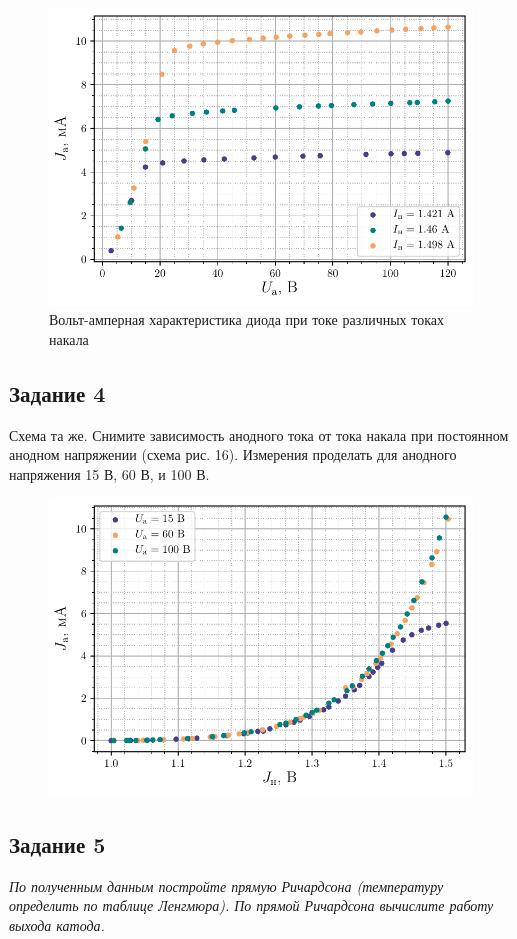 \begin{figure}[H]
	\centering
    \includegraphics[scale=1]{scripts/fig3}
	\caption{Вольт-амперная характеристика диода при токе различных токах
    накала}
	\label{fig:17}
\end{figure}

\subsection{Задание 4}
Схема та же. Снимите зависимость анодного тока от тока накала при постоянном анодном напряжении (схема рис. 16). Измерения проделать для анодного напряжения 15 В, 60 В, и 100 В.

\begin{figure}[H]
	\centering
    \includegraphics[width=0.85\linewidth]{scripts/fig4}
	\caption{}
	\label{fig:18}
\end{figure}

\subsection{Задание 5}
\textit{По полученным данным постройте прямую Ричардсона (температуру
    определить по таблице Ленгмюра). По прямой Ричардсона вычислите работу
выхода катода.}


